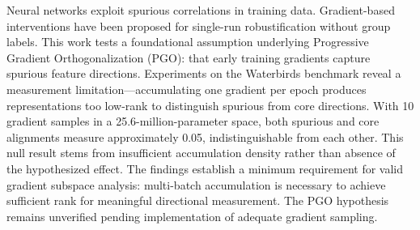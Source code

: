 
Neural networks exploit spurious correlations in training data. Gradient-based interventions have been proposed for single-run robustification without group labels. This work tests a foundational assumption underlying Progressive Gradient Orthogonalization (PGO): that early training gradients capture spurious feature directions. Experiments on the Waterbirds benchmark reveal a measurement limitation---accumulating one gradient per epoch produces representations too low-rank to distinguish spurious from core directions. With 10 gradient samples in a 25.6-million-parameter space, both spurious and core alignments measure approximately 0.05, indistinguishable from each other. This null result stems from insufficient accumulation density rather than absence of the hypothesized effect. The findings establish a minimum requirement for valid gradient subspace analysis: multi-batch accumulation is necessary to achieve sufficient rank for meaningful directional measurement. The PGO hypothesis remains unverified pending implementation of adequate gradient sampling.

